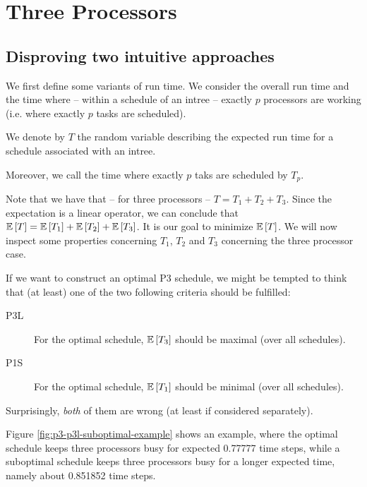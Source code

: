 \chapter{Three Processors}
\label{chap:p3}



\section{Disproving two intuitive approaches}
\label{sec:p3-disproving-long-p3-and-short-p1-time}

We first define some variants of run time. We consider the overall run time and the time where -- within a schedule of an intree -- exactly $p$ processors are working (i.e. where exactly $p$ tasks are scheduled).

\begin{definition}
  We denote by $T$ the random variable describing the expected run time for a schedule associated with an intree. 

  Moreover, we call the time where exactly $p$ taks are scheduled by $T_p$.
\end{definition}

Note that we have that -- for three processors -- $T=T_1 + T_2 + T_3$. Since the expectation is a linear operator, we can conclude that $\mathbb{E}\left[ T \right]=\mathbb{E}\left[ T_1 \right]+\mathbb{E}\left[ T_2 \right]+\mathbb{E}\left[ T_3 \right]$. It is our goal to minimize $\mathbb{E}\left[ T \right]$. We will now inspect some properties concerning $T_1$, $T_2$ and $T_3$ concerning the three processor case.

If we want to construct an optimal P3 schedule, we might be tempted to think that (at least) one of the two following criteria should be fulfilled:

\begin{description}
\item[P3L] For the optimal schedule, $\mathbb{E}\left[ T_3 \right]$ should be maximal (over all schedules).
\item[P1S] For the optimal schedule, $\mathbb{E}\left[ T_1 \right]$ should be minimal (over all schedules).
\end{description}

Surprisingly, \emph{both} of them are wrong (at least if considered separately).

Figure \ref{fig:p3-p3l-suboptimal-example} shows an example, where the optimal schedule keeps three processors busy for expected 0.77777 time steps, while a suboptimal schedule keeps three processors busy for a longer expected time, namely about 0.851852 time steps.

